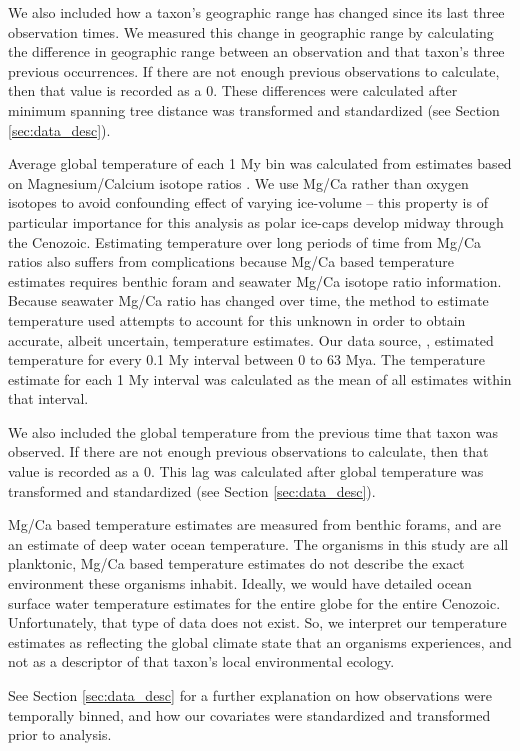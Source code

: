 \documentclass[12pt,letterpaper]{article}
\begin{document}
\begin{refsection}
We also included how a taxon's geographic range has changed since its last three observation times. We measured this change in geographic range by calculating the difference in geographic range between an observation and that taxon's three previous occurrences. If there are not enough previous observations to calculate, then that value is recorded as a 0. These differences were calculated after minimum spanning tree distance was transformed and standardized (see Section \ref{sec:data_desc}).

Average global temperature of each 1 My bin was calculated from estimates based on Magnesium/Calcium isotope ratios \citet{Cramer2011}. We use Mg/Ca rather than oxygen isotopes to avoid confounding effect of varying ice-volume -- this property is of particular importance for this analysis as polar ice-caps develop midway through the Cenozoic. Estimating temperature over long periods of time from Mg/Ca ratios also suffers from complications because Mg/Ca based temperature estimates requires benthic foram and seawater Mg/Ca isotope ratio information. Because seawater Mg/Ca ratio has changed over time, the method to estimate temperature used \citet{Cramer2011} attempts to account for this unknown in order to obtain accurate, albeit uncertain, temperature estimates. Our data source, \citet{Cramer2011}, estimated temperature for every 0.1 My interval between 0 to 63 Mya. The temperature estimate for each 1 My interval was calculated as the mean of all estimates within that interval. 

We also included the global temperature from the previous time that taxon was observed. If there are not enough previous observations to calculate, then that value is recorded as a 0. This lag was calculated after global temperature was transformed and standardized (see Section \ref{sec:data_desc}).

Mg/Ca based temperature estimates are measured from benthic forams, and are an estimate of deep water ocean temperature. The organisms in this study are all planktonic, Mg/Ca based temperature estimates do not describe the exact environment these organisms inhabit. Ideally, we would have detailed ocean surface water temperature estimates for the entire globe for the entire Cenozoic. Unfortunately, that type of data does not exist. So, we interpret our temperature estimates as reflecting the global climate state that an organisms experiences, and not as a descriptor of that taxon's local environmental ecology.

See Section \ref{sec:data_desc} for a further explanation on how observations were temporally binned, and how our covariates were standardized and transformed prior to analysis.



\end{refsection}
\end{document}
